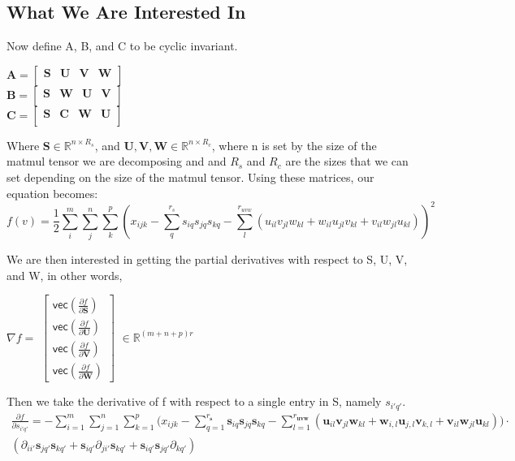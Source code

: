 \documentclass{article}
\begin{document}
\subsection{What We Are Interested In}
Now define A, B, and C to be cyclic invariant. 
\begin{center}
    $\mathbf{A} = \begin{bmatrix}
        \mathbf{S} & \mathbf{U} & \mathbf{V} & \mathbf{W}\\
    \end{bmatrix}$\\
    $\mathbf{B} = \begin{bmatrix}
        \mathbf{S} & \mathbf{W} & \mathbf{U} & \mathbf{V}\\
    \end{bmatrix}$\\
    $\mathbf{C} = \begin{bmatrix}
        \mathbf{S} & \mathbf{C} & \mathbf{W} & \mathbf{U}\\
    \end{bmatrix}$
\end{center}
Where $\mathbf{S} \in \mathbb{R}^{n\times R_s}$, and $\mathbf{U, V, W} \in \mathbb{R}^{n\times R_c}$, where n is set by the size of the matmul tensor we are decomposing and  and  $R_s$ and $R_c$ are the sizes that we can set depending on the size of the matmul tensor. Using these matrices, our equation becomes:
\begin{equation}
    f(v) = \frac{1}{2} \sum_{i}^m \sum_{j}^n \sum_{k}^p \left( x_{ijk} - \sum_{q}^{r_s} s_{iq}s_{jq}s_{kq} - \sum_{l}^{r_{uvw}} (u_{il}v_{jl}w_{kl} + w_{il}u_{jl}v_{kl} + v_{il}w_{jl}u_{kl}) \right)^2
\end{equation}

We are then interested in getting the partial derivatives with respect to S, U, V, and W, in other words,
\begin{center}
    $\nabla f =$
    $\begin{bmatrix}
        \mathsf{vec}(\frac{\partial f}{\partial \mathbf{S}})\\
        \mathsf{vec}(\frac{\partial f}{\partial \mathbf{U}})\\
        \mathsf{vec}(\frac{\partial f}{\partial \mathbf{V}})\\
        \mathsf{vec}(\frac{\partial f}{\partial \mathbf{W}})
    \end{bmatrix}$
    $\in \mathbb{R}^{(m+n+p)r}$
\end{center}

Then we take the derivative of f with respect to a single entry in S, namely $s_{i'q'}$.
\begin{eqnarray*}
    \frac{\partial f}{\partial s_{i'q'}} = - \sum_{i=1}^m\sum_{j=1}^n\sum_{k=1}^p\bigl(x_{ijk}-\sum_{q=1}^{r_\mathbf{s}}\mathbf{s}_{iq}\mathbf{s}_{jq}\mathbf{s}_{kq}-\sum_{l=1}^{r_\mathbf{uvw}}(\mathbf{u}_{il}\mathbf{v}_{jl}\mathbf{w}_{kl} + \mathbf{w}_{i,l}\mathbf{u}_{j,l}\mathbf{v}_{k,l} + \mathbf{v}_{il}\mathbf{w}_{jl}\mathbf{u}_{kl})\bigl) \cdot \\
    (\partial_{ii'} \mathbf{s}_{jq'}\mathbf{s}_{kq'} + \mathbf{s}_{iq'}\partial_{ji'} \mathbf{s}_{kq'} + \mathbf{s}_{iq'}\mathbf{s}_{jq'}\partial_{kq'})
\end{eqnarray*}
\end{document}
